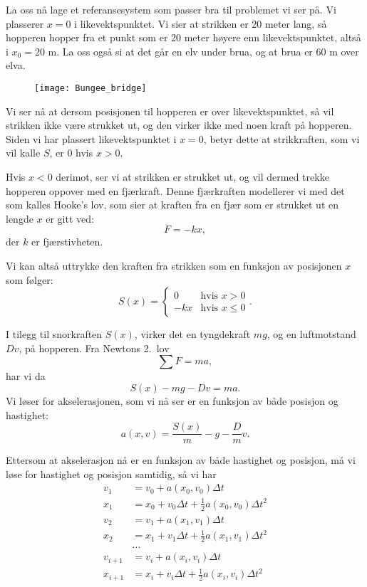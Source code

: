 \documentclass[a4paper, 11pt, notitlepage]{article}
\begin{document}
La oss nå lage et referansesystem som passer bra til problemet vi ser på. Vi plasserer $x=0$ i likevektspunktet. Vi sier at strikken er 20 meter lang, så hopperen hopper fra et punkt som er 20 meter høyere enn likevektspunktet, altså i $x_0 = 20$ m. La oss også si at det går en elv under brua, og at brua er 60 m over elva.

\begin{figure}[h!b]
\centering
\texttt{[image: Bungee\_bridge]}
\end{figure}

Vi ser nå at dersom posisjonen til hopperen er over likevektspunktet, så vil strikken ikke være strukket ut, og den virker ikke med noen kraft på hopperen. Siden vi har plassert likevektspunktet i $x=0$, betyr dette at strikkraften, som vi vil kalle $S$, er 0 hvis $x>0$.

Hvis $x<0$ derimot, ser vi at strikken er strukket ut, og vil dermed trekke hopperen oppover med en fjærkraft. Denne fjærkraften modellerer vi med det som kalles Hooke's lov, som sier at kraften fra en fjær som er strukket ut en lengde $x$ er gitt ved:
$$F = -kx,$$
der $k$ er fjærstivheten. 

Vi kan altså uttrykke den kraften fra strikken som en funksjon av posisjonen $x$ som følger:
$$S(x) = \begin{cases} 0 & \mbox{hvis } x>0 \\
-kx & \mbox{hvis } x \leq 0
\end{cases}.$$

I tilegg til snorkraften $S(x)$, virker det en tyngdekraft $mg$, og en luftmotstand $Dv$, på hopperen. Fra Newtons 2.\ lov
$$\sum F = ma,$$
har vi da
$$S(x) - mg - Dv = ma.$$
Vi løser for akselerasjonen, som vi nå ser er en funksjon av både posisjon og hastighet:
$$a(x,v) = \frac{S(x)}{m} - g - \frac{D}{m}v.$$

Ettersom at akselerasjon nå er en funksjon av både hastighet og posisjon, må vi løse for hastighet og posisjon samtidig, så vi har
\begin{align*}
v_1 &= v_0 + a(x_0, v_0)\Delta t \\
x_1 &= x_0 + v_0\Delta t + \frac{1}{2}a(x_0, v_0)\Delta t^2 \\
v_2 &= v_1 + a(x_1, v_1)\Delta t \\
x_2 &= x_1 + v_1\Delta t + \frac{1}{2}a(x_1, v_1)\Delta t^2 \\
&\hdots \\
v_{i+1} &= v_i + a(x_i, v_i)\Delta t \\
x_{i+1} &= x_i + v_i\Delta t + \frac{1}{2}a(x_i, v_i)\Delta t^2 \\
\end{align*}
\end{document}
